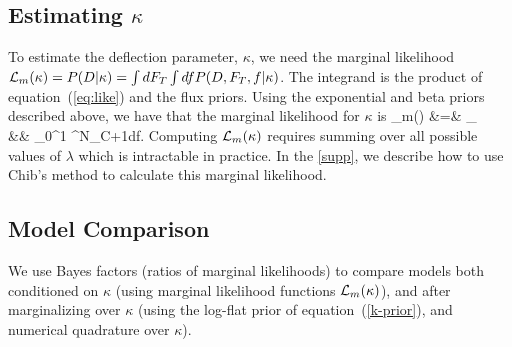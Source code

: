 \subsection{Estimating $\kappa$}

To estimate the deflection parameter, $\kappa$, we need the marginal
likelihood ${\cal L}_m(\kappa) = P(D|\kappa) = \int dF_T\int df
P(D,F_T,f|\kappa)$.  The integrand is the product of equation~(\ref{eq:like})
and the flux priors.  Using the exponential and beta priors described above,
we have that the marginal likelihood for $\kappa$ is
\ba
\like_m(\kappa)
  &=& \sum_\lambda {}\nonumber\\
  &&  \times\int_0^1
           {^{N_C+1}}df.
\label{eq:marg}
\ea
Computing ${\cal L}_m(\kappa)$ requires summing over all possible values of
$\lambda$ which is intractable in practice.  In the \ref{supp}, we
describe how to use Chib's method \cite{MR1379473} to calculate this
marginal likelihood.

\subsection{Model Comparison}


We use Bayes factors (ratios of marginal likelihoods) to compare models both
conditioned on $\kappa$ (using marginal likelihood functions
${\cal L}_m(\kappa)$), and after marginalizing over $\kappa$ (using the log-flat
prior of equation~(\ref{k-prior}), and numerical quadrature over
$\kappa$).

